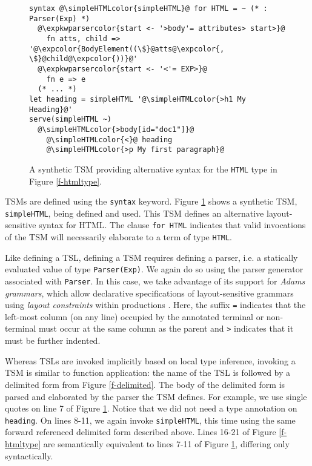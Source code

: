 \documentclass{sig-alternate}[10pt]
\newcommand{\expkwparsercolor}[1]{\textcolor[HTML]{336699}{#1}}
\newcommand{\expcolor}[1]{\textcolor[HTML]{FF0033}{#1}}
\newcommand{\simpleHTMLcolor}[1]{\textcolor[HTML]{7D5100}{#1}}
\newcommand{\mycaption}[1]{\vspace{-10px}\caption{#1}\vspace{-8px}}
\newcommand{\lstinlinew}[1]{\lstinline[style=wyvern]{#1}}
\begin{document}
\begin{figure}[t]
\begin{lstlisting}[style=wyvern]
syntax @\simpleHTMLcolor{simpleHTML}@ for HTML = ~ (* : Parser(Exp) *)
  @\expkwparsercolor{start <- '>body'= attributes> start>}@
    fn atts, child => '@\expcolor{BodyElement((\$}@atts@\expcolor{, \$}@child@\expcolor{))}@'
  @\expkwparsercolor{start <- '<'= EXP>}@
    fn e => e
  (* ... *)
let heading = simpleHTML '@\simpleHTMLcolor{>h1 My Heading}@'
serve(simpleHTML ~)
  @\simpleHTMLcolor{>body[id="doc1"]}@
    @\simpleHTMLcolor{<}@ heading
    @\simpleHTMLcolor{>p My first paragraph}@
\end{lstlisting}
\mycaption{A synthetic TSM providing alternative syntax for the \texttt{HTML} type in Figure \ref{f-htmltype}.}
\label{f-simplehtml}
\end{figure}
TSMs are defined using the \lstinlinew{syntax} keyword. Figure \ref{f-simplehtml} shows a synthetic TSM, \lstinlinew{simpleHTML}, being defined and used. This TSM defines an alternative layout-sensitive syntax for HTML. The clause \lstinlinew{for HTML} indicates that valid invocations of the TSM will necessarily elaborate to a term of type \lstinlinew{HTML}. 

Like defining a TSL, defining a TSM requires defining a parser, i.e. a statically evaluated value of type \lstinlinew{Parser(Exp)}. We again do so using the parser generator associated with \lstinlinew{Parser}. In this case, we take advantage of its support for \emph{Adams grammars}, which allow declarative specifications of layout-sensitive grammars using \emph{layout constraints} within productions \cite{Adams:2013:PPI:2429069.2429129}. Here, the suffix \lstinlinew{=} indicates that the left-most column (on any line) occupied by the annotated terminal or non-terminal must occur at the same column as the parent  and \lstinlinew{>} indicates that it must be further indented. %

Whereas TSLs are invoked implicitly based on local type inference, invoking a TSM is similar to function application: the name of the TSL is followed by a delimited form from Figure \ref{f-delimited}. The body of the delimited form is parsed and elaborated by the parser the TSM defines. %
For example, we use single quotes on line 7 of Figure \ref{f-simplehtml}. Notice that we did not need a type annotation on \lstinlinew{heading}. %
 On lines 8-11, we again invoke \lstinlinew{simpleHTML}, this time using the same forward referenced delimited form described above. Lines 16-21 of Figure \ref{f-htmltype} are semantically equivalent to lines 7-11 of Figure \ref{f-simplehtml}, differing only syntactically.
\end{document}

